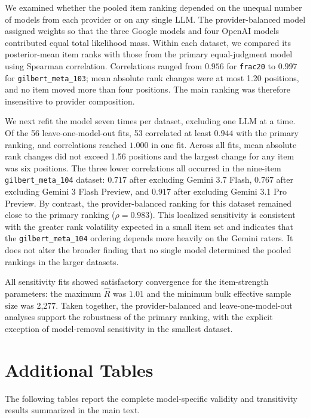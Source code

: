 \documentclass[11pt]{article}
\begin{document}
We examined whether the pooled item ranking depended on the unequal number of models from each provider or on any single LLM. The provider-balanced model assigned weights so that the three Google models and four OpenAI models contributed equal total likelihood mass. Within each dataset, we compared its posterior-mean item ranks with those from the primary equal-judgment model using Spearman correlation. Correlations ranged from $0.956$ for \texttt{frac20} to $0.997$ for \texttt{gilbert\_meta\_103}; mean absolute rank changes were at most 1.20 positions, and no item moved more than four positions. The main ranking was therefore insensitive to provider composition.

We next refit the model seven times per dataset, excluding one LLM at a time. Of the 56 leave-one-model-out fits, 53 correlated at least $0.944$ with the primary ranking, and correlations reached $1.000$ in one fit. Across all fits, mean absolute rank changes did not exceed 1.56 positions and the largest change for any item was six positions. The three lower correlations all occurred in the nine-item \texttt{gilbert\_meta\_104} dataset: $0.717$ after excluding Gemini 3.7 Flash, $0.767$ after excluding Gemini 3 Flash Preview, and $0.917$ after excluding Gemini 3.1 Pro Preview. By contrast, the provider-balanced ranking for this dataset remained close to the primary ranking ($\rho=0.983$). This localized sensitivity is consistent with the greater rank volatility expected in a small item set and indicates that the \texttt{gilbert\_meta\_104} ordering depends more heavily on the Gemini raters. It does not alter the broader finding that no single model determined the pooled rankings in the larger datasets.

All sensitivity fits showed satisfactory convergence for the item-strength parameters: the maximum $\hat{R}$ was $1.01$ and the minimum bulk effective sample size was 2,277. Taken together, the provider-balanced and leave-one-model-out analyses support the robustness of the primary ranking, with the explicit exception of model-removal sensitivity in the smallest dataset.

\section{Additional Tables}
\label{app:tables}
The following tables report the complete model-specific validity and transitivity results summarized in the main text.
\end{document}
